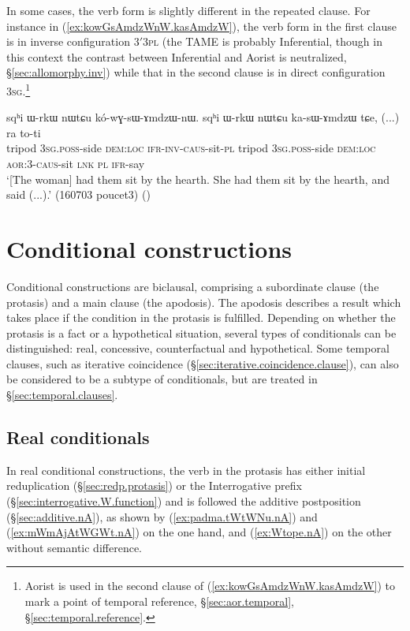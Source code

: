 In some cases, the verb form is slightly different in the repeated clause. For instance in (\ref{ex:kowGsAmdzWnW.kasAmdzW}), the verb form in the first clause is in inverse configuration 3$'$\fl{}\textsc{3pl} (the TAME is probably Inferential, though in this context the contrast between Inferential and Aorist is neutralized, §\ref{sec:allomorphy.inv}) while that in the second clause is in direct configuration \textsc{3sg}\flobv{}.\footnote{Aorist is used in the second clause of (\ref{ex:kowGsAmdzWnW.kasAmdzW}) to mark a point of temporal reference, §\ref{sec:aor.temporal}, §\ref{sec:temporal.reference}.}

\begin{exe}
\ex \label{ex:kowGsAmdzWnW.kasAmdzW}
\gll sqʰi ɯ-rkɯ nɯtɕu kó-wɣ-sɯ-ɤmdzɯ-nɯ. sqʰi ɯ-rkɯ nɯtɕu ka-sɯ-ɤmdzɯ tɕe, (...) ra to-ti \\
tripod \textsc{3sg}.\textsc{poss}-side \textsc{dem}:\textsc{loc} \textsc{ifr}-\textsc{inv}-\textsc{caus}-sit-\textsc{pl} tripod \textsc{3sg}.\textsc{poss}-side \textsc{dem}:\textsc{loc} \textsc{aor}:3\flobv{}-\textsc{caus}-sit \textsc{lnk} { } \textsc{pl} \textsc{ifr}-say \\
\glt `[The woman] had them sit by the hearth. She had them sit by the hearth, and said (...).' (160703 poucet3)
()
\end{exe}

\section{Conditional constructions} \label{sec:conditionals}
Conditional constructions are biclausal, comprising a subordinate clause (the protasis) and a main clause (the apodosis). The apodosis describes a result which takes place if the condition in the protasis is fulfilled. Depending on whether the protasis is a fact or a hypothetical situation, several types of conditionals can be distinguished: real, concessive, counterfactual and hypothetical. Some temporal clauses, such as iterative coincidence (§\ref{sec:iterative.coincidence.clause}), can also be considered to be a subtype of conditionals, but are treated in §\ref{sec:temporal.clauses}.

\subsection{Real conditionals} \label{sec:real.conditional}
In real conditional constructions, the verb in the protasis has either initial reduplication (§\ref{sec:redp.protasis}) or the Interrogative  prefix (§\ref{sec:interrogative.W.function}) and is followed the additive postposition  (§\ref{sec:additive.nA}),  as shown by (\ref{ex:padma.tWtWNu.nA}) and (\ref{ex:mWmAjAtWGWt.nA}) on the one hand, and (\ref{ex:Wtope.nA}) on the other without semantic difference.

